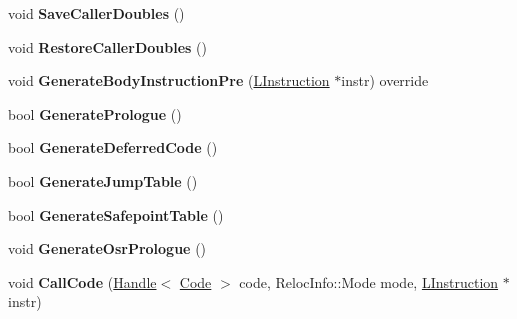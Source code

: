 \begin{DoxyCompactItemize}
\item 
void {\bfseries Save\+Caller\+Doubles} ()\hypertarget{classv8_1_1internal_1_1_l_code_gen_a668f6d1f7c5aaf43fbfce22898808064}{}\label{classv8_1_1internal_1_1_l_code_gen_a668f6d1f7c5aaf43fbfce22898808064}

\item 
void {\bfseries Restore\+Caller\+Doubles} ()\hypertarget{classv8_1_1internal_1_1_l_code_gen_a094ae8da5b8b7b7d12990d25a4db2272}{}\label{classv8_1_1internal_1_1_l_code_gen_a094ae8da5b8b7b7d12990d25a4db2272}

\item 
void {\bfseries Generate\+Body\+Instruction\+Pre} (\hyperlink{classv8_1_1internal_1_1_l_instruction}{L\+Instruction} $\ast$instr) override\hypertarget{classv8_1_1internal_1_1_l_code_gen_a85d4251ce8010cd6b04358d6f54e1d13}{}\label{classv8_1_1internal_1_1_l_code_gen_a85d4251ce8010cd6b04358d6f54e1d13}

\item 
bool {\bfseries Generate\+Prologue} ()\hypertarget{classv8_1_1internal_1_1_l_code_gen_aff05496f75e5706dc01028ef21cd2065}{}\label{classv8_1_1internal_1_1_l_code_gen_aff05496f75e5706dc01028ef21cd2065}

\item 
bool {\bfseries Generate\+Deferred\+Code} ()\hypertarget{classv8_1_1internal_1_1_l_code_gen_a7edbe3129e1ff758f4c3d471d6038aee}{}\label{classv8_1_1internal_1_1_l_code_gen_a7edbe3129e1ff758f4c3d471d6038aee}

\item 
bool {\bfseries Generate\+Jump\+Table} ()\hypertarget{classv8_1_1internal_1_1_l_code_gen_af066f353885f2f3cec35f74445989328}{}\label{classv8_1_1internal_1_1_l_code_gen_af066f353885f2f3cec35f74445989328}

\item 
bool {\bfseries Generate\+Safepoint\+Table} ()\hypertarget{classv8_1_1internal_1_1_l_code_gen_aa8cc24b1134b87ea8ce0a9a5c5688b5a}{}\label{classv8_1_1internal_1_1_l_code_gen_aa8cc24b1134b87ea8ce0a9a5c5688b5a}

\item 
void {\bfseries Generate\+Osr\+Prologue} ()\hypertarget{classv8_1_1internal_1_1_l_code_gen_a911d24be4ac4e392d736d9769b7ebb8f}{}\label{classv8_1_1internal_1_1_l_code_gen_a911d24be4ac4e392d736d9769b7ebb8f}

\item 
void {\bfseries Call\+Code} (\hyperlink{classv8_1_1internal_1_1_handle}{Handle}$<$ \hyperlink{classv8_1_1internal_1_1_code}{Code} $>$ code, Reloc\+Info\+::\+Mode mode, \hyperlink{classv8_1_1internal_1_1_l_instruction}{L\+Instruction} $\ast$instr)\hypertarget{classv8_1_1internal_1_1_l_code_gen_aca293066a99024759f94b995c6ba5ce5}{}\label{classv8_1_1internal_1_1_l_code_gen_aca293066a99024759f94b995c6ba5ce5}


\end{DoxyCompactItemize}
